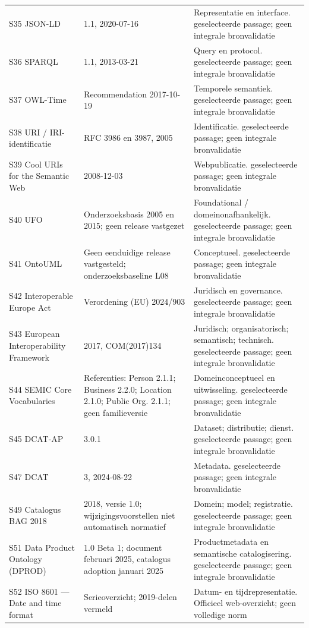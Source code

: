 \begin{longtable}{@{}P{.29\linewidth}P{.22\linewidth}P{.41\linewidth}@{}}
S35 JSON-LD & 1.1, 2020-07-16 & Representatie en interface. geselecteerde passage; geen integrale bronvalidatie \\
S36 SPARQL & 1.1, 2013-03-21 & Query en protocol. geselecteerde passage; geen integrale bronvalidatie \\
S37 OWL-Time & Recommendation 2017-10-19 & Temporele semantiek. geselecteerde passage; geen integrale bronvalidatie \\
S38 URI / IRI-identificatie & RFC 3986 en 3987, 2005 & Identificatie. geselecteerde passage; geen integrale bronvalidatie \\
S39 Cool URIs for the Semantic Web & 2008-12-03 & Webpublicatie. geselecteerde passage; geen integrale bronvalidatie \\
S40 UFO & Onderzoeksbasis 2005 en 2015; geen release vastgezet & Foundational / domeinonafhankelijk. geselecteerde passage; geen integrale bronvalidatie \\
S41 OntoUML & Geen eenduidige release vastgesteld; onderzoeksbaseline L08 & Conceptueel. geselecteerde passage; geen integrale bronvalidatie \\
S42 Interoperable Europe Act & Verordening (EU) 2024/903 & Juridisch en governance. geselecteerde passage; geen integrale bronvalidatie \\
S43 European Interoperability Framework & 2017, COM(2017)134 & Juridisch; organisatorisch; semantisch; technisch. geselecteerde passage; geen integrale bronvalidatie \\
S44 SEMIC Core Vocabularies & Referenties: Person 2.1.1; Business 2.2.0; Location 2.1.0; Public Org. 2.1.1; geen familie\-versie & Domeinconceptueel en uitwisseling. geselecteerde passage; geen integrale bronvalidatie \\
S45 DCAT-AP & 3.0.1 & Dataset; distributie; dienst. geselecteerde passage; geen integrale bronvalidatie \\
S47 DCAT & 3, 2024-08-22 & Metadata. geselecteerde passage; geen integrale bronvalidatie \\
S49 Catalogus BAG 2018 & 2018, versie 1.0; wijzigingsvoorstellen niet automatisch normatief & Domein; model; registratie. geselecteerde passage; geen integrale bronvalidatie \\
S51 Data Product Ontology (DPROD) & 1.0 Beta 1; document februari 2025, catalogus adoption januari 2025 & Productmetadata en semantische catalogisering. geselecteerde passage; geen integrale bronvalidatie \\
S52 ISO 8601 — Date and time format & Serieoverzicht; 2019-delen vermeld & Datum- en tijdrepresentatie. Officieel web-overzicht; geen volledige norm \\
\bottomrule\end{longtable}\normalsize
